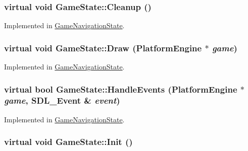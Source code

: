 \hypertarget{class_game_state_041e7a5430d71da84745af11abdacd93}{
\subsubsection[{Cleanup}]{\setlength{\rightskip}{0pt plus 5cm}virtual void GameState::Cleanup ()}}
\label{class_game_state_041e7a5430d71da84745af11abdacd93}




Implemented in \hyperlink{class_game_navigation_state_f93a7dbb7eac4b14a6d59cbca32b9abd}{GameNavigationState}.\hypertarget{class_game_state_7333dda0f49b3fa1c01cd3295f853024}{
\subsubsection[{Draw}]{\setlength{\rightskip}{0pt plus 5cm}virtual void GameState::Draw ({\bf PlatformEngine} $\ast$ {\em game})}}
\label{class_game_state_7333dda0f49b3fa1c01cd3295f853024}




Implemented in \hyperlink{class_game_navigation_state_a37dce070a906454c512192c067fda09}{GameNavigationState}.\hypertarget{class_game_state_de7bd9bda91253614322ca0ea77b7a14}{
\subsubsection[{HandleEvents}]{\setlength{\rightskip}{0pt plus 5cm}virtual bool GameState::HandleEvents ({\bf PlatformEngine} $\ast$ {\em game}, \/  SDL\_\-Event \& {\em event})}}
\label{class_game_state_de7bd9bda91253614322ca0ea77b7a14}




Implemented in \hyperlink{class_game_navigation_state_6e7c13d35a33478673c62ae55394cfdc}{GameNavigationState}.\hypertarget{class_game_state_eec488593bae214c0f738bd64dafba32}{
\subsubsection[{Init}]{\setlength{\rightskip}{0pt plus 5cm}virtual void GameState::Init ()}}
\label{class_game_state_eec488593bae214c0f738bd64dafba32}




